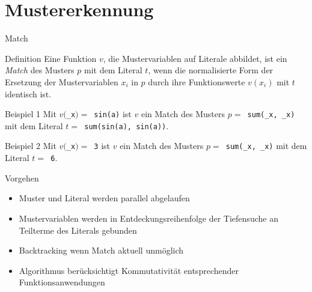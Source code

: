 \documentclass{beamer}
\begin{document}
\section{Mustererkennung}
\begin{frame}[fragile]{Match}
	\begin{block}{Definition}
		Eine Funktion $v$, die Mustervariablen auf Literale abbildet, ist ein \emph{Match} des Musters $p$ mit dem Literal $t$, wenn die normalisierte Form der Ersetzung der Mustervariablen $x_i$ in $p$ durch ihre Funktionswerte $v(x_i)$ mit $t$ identisch ist.
	\end{block}
	
	\pause
	\begin{block}{Beispiel 1}
		Mit $v($\verb~_x~$) =$\verb~ sin(a)~ ist $v$ ein Match des
		Musters $p =$\verb~ sum(_x, _x)~ mit dem Literal $t =$\verb~ sum(sin(a), sin(a))~.
	\end{block}
	
	\pause
	\begin{block}{Beispiel 2}
		Mit $v($\verb~_x~$) =$\verb~ 3~ ist $v$ ein Match des
		Musters $p =$\verb~ sum(_x, _x)~ mit dem Literal $t =$\verb~ 6~.
	\end{block}
\end{frame}


\begin{frame}[fragile]{Vorgehen}
	\begin{itemize}
		\item{Muster und Literal werden parallel abgelaufen}
		\item{Mustervariablen werden in Entdeckungsreihenfolge der Tiefensuche an Teilterme des Literals gebunden}
		\item{Backtracking wenn Match aktuell unmöglich}
		\item{Algorithmus berücksichtigt Kommutativität entsprechender Funktionsanwendungen}
	\end{itemize}
\end{frame}

\end{document}
